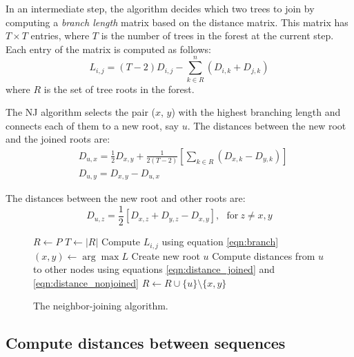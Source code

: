 \documentclass[11pt,letterpaper]{article}
\theoremstyle{definition}
\begin{document}
In an intermediate step, the algorithm decides which two trees to join by computing a \textit{branch length} matrix based on the distance matrix. This matrix has $T \times T$ entries, where $T$ is the number of trees in the forest at the current step. Each entry of the matrix is computed as follows:  
\begin{equation}
  L_{i, j} = (T - 2) D_{i, j} - \sum_{k \in R}^n (D_{i, k} + D_{j, k})
  \label{eqn:branch}
\end{equation} where $R$ is the set of tree roots in the forest.

The NJ algorithm selects the pair ($x$, $y$) with the highest branching length and connects each of them to a new root, say $u$. The distances between the new root and the joined roots are:  
\begin{equation}
\begin{split}
& D_{u, x} = \frac{1}{2} D_{x, y} + \frac{1}{2(T - 2)} \left[ \sum_{k \in R} (D_{x, k} - D_{y, k}) \right] 
\\  
& D_{u, y} = D_{x, y} - D_{u, x}
\end{split}
\label{eqn:distance_joined}
\end{equation}

The distances between the new root and other roots are:
\begin{equation}
  D_{u, z} = \frac{1}{2} \left[ D_{x, z} + D_{y, z} - D_{x, y} \right], \ \ \ \text{for} \ z \neq x, y
\label{eqn:distance_nonjoined}
\end{equation}

\begin{figure}
  \begin{algorithmic}[1]
      \State $R \leftarrow P$
        \State $T \leftarrow |R|$
          \State Compute $L_{i, j}$ using equation \ref{eqn:branch} 
        \EndFor
        \State $(x, y) \leftarrow \arg \max L$
        \State Create new root $u$
        \State Compute distances from $u$ to other nodes using equations \ref{eqn:distance_joined} and \ref{eqn:distance_nonjoined}
        \State $R \leftarrow R \cup \{u\} \setminus \{x, y\}$
      \EndFor
    \EndFunction
  \end{algorithmic}
  \caption{\label{alg:nj}The neighbor-joining algorithm.}
\end{figure}

\subsection{Compute distances between sequences}
\end{document}
